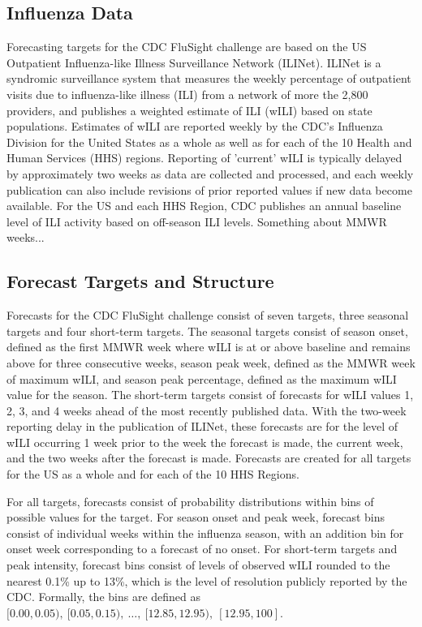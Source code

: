 \documentclass{article}
\begin{document}
\subsection{Influenza Data}
Forecasting targets for the CDC FluSight challenge are based on the US Outpatient Influenza-like Illness Surveillance Network (ILINet). ILINet is a syndromic surveillance system that measures the weekly percentage of outpatient visits due to influenza-like illness (ILI) from a network of more the 2,800 providers, and publishes a weighted estimate of ILI (wILI) based on state populations. Estimates of wILI are reported weekly by the CDC's Influenza Division for the United States as a whole as well as for each of the 10 Health and Human Services (HHS) regions. Reporting of 'current' wILI is typically delayed by approximately two weeks as data are collected and processed, and each weekly publication can also include revisions of prior reported values if new data become available. For the US and each HHS Region, CDC publishes an annual baseline level of ILI activity based on off-season ILI levels. Something about MMWR weeks...

\subsection{Forecast Targets and Structure}
Forecasts for the CDC FluSight challenge consist of seven targets, three seasonal targets and four short-term targets. The seasonal targets consist of season onset, defined as the first MMWR week where wILI is at or above baseline and remains above for three consecutive weeks, season peak week, defined as the MMWR week of maximum wILI, and season peak percentage, defined as the maximum wILI value for the season. The short-term targets consist of forecasts for wILI values 1, 2, 3, and 4 weeks ahead of the most recently published data. With the two-week reporting delay in the publication of ILINet, these forecasts are for the level of wILI occurring 1 week prior to the week the forecast is made, the current week, and the two weeks after the forecast is made. Forecasts are created for all targets for the US as a whole and for each of the 10 HHS Regions.

For all targets, forecasts consist of probability distributions within bins of possible values for the target. For season onset and peak week, forecast bins consist of individual weeks within the influenza season, with an addition bin for onset week corresponding to a forecast of no onset. For short-term targets and peak intensity, forecast bins consist of levels of observed wILI rounded to the nearest 0.1\% up to 13\%, which is the level of resolution publicly reported by the CDC. Formally, the bins are defined as $[0.00, 0.05),\ [0.05, 0.15),\ \dots,\ [12.85, 12.95),\ [12.95, 100]$. 
\end{document}
